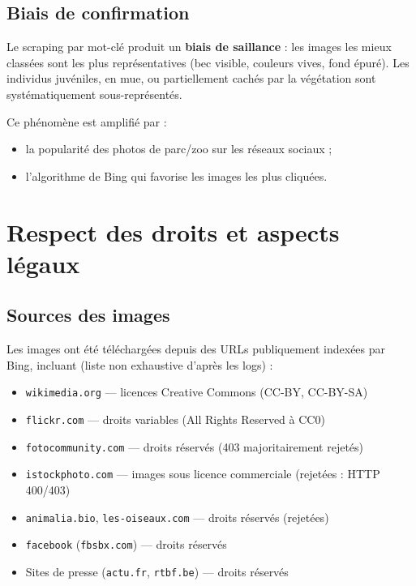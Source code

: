 \documentclass[12pt,a4paper]{article}
\begin{document}
\subsection{Biais de confirmation}

Le scraping par mot-clé produit un \textbf{biais de saillance} : les images les mieux classées
sont les plus représentatives (bec visible, couleurs vives, fond épuré). Les individus juvéniles,
en mue, ou partiellement cachés par la végétation sont systématiquement sous-représentés.

Ce phénomène est amplifié par :
\begin{itemize}
  \item la popularité des photos de parc/zoo sur les réseaux sociaux ;
  \item l'algorithme de Bing qui favorise les images les plus cliquées.
\end{itemize}

\section{Respect des droits et aspects légaux}

\subsection{Sources des images}

Les images ont été téléchargées depuis des URLs publiquement indexées par Bing, incluant
(liste non exhaustive d'après les logs) :

\begin{itemize}
  \item \texttt{wikimedia.org} — licences Creative Commons (CC-BY, CC-BY-SA)
  \item \texttt{flickr.com} — droits variables (All Rights Reserved à CC0)
  \item \texttt{fotocommunity.com} — droits réservés (403 majoritairement rejetés)
  \item \texttt{istockphoto.com} — images sous licence commerciale (rejetées : HTTP 400/403)
  \item \texttt{animalia.bio}, \texttt{les-oiseaux.com} — droits réservés (rejetées)
  \item \texttt{facebook} (\texttt{fbsbx.com}) — droits réservés
  \item Sites de presse (\texttt{actu.fr}, \texttt{rtbf.be}) — droits réservés
\end{itemize}
\end{document}
